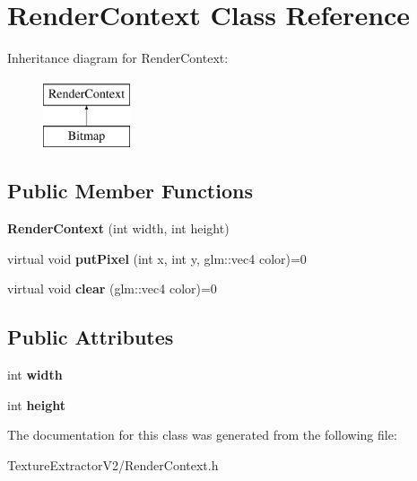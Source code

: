 \hypertarget{class_render_context}{}\section{Render\+Context Class Reference}
\label{class_render_context}
Inheritance diagram for Render\+Context\+:\begin{figure}[H]
\begin{center}
\leavevmode
\includegraphics[height=2.000000cm]{class_render_context}
\end{center}
\end{figure}
\subsection*{Public Member Functions}
\begin{DoxyCompactItemize}
\item 
\hypertarget{class_render_context_aff0b414b1aa39e7c5ca4ed5cadf20721}{}{\bfseries Render\+Context} (int width, int height)\label{class_render_context_aff0b414b1aa39e7c5ca4ed5cadf20721}

\item 
\hypertarget{class_render_context_a722f7e593dc2c480ad5a2a448196c2dc}{}virtual void {\bfseries put\+Pixel} (int x, int y, glm\+::vec4 color)=0\label{class_render_context_a722f7e593dc2c480ad5a2a448196c2dc}

\item 
\hypertarget{class_render_context_a9c6a34962ba769bacbb054ea435dfce8}{}virtual void {\bfseries clear} (glm\+::vec4 color)=0\label{class_render_context_a9c6a34962ba769bacbb054ea435dfce8}

\end{DoxyCompactItemize}
\subsection*{Public Attributes}
\begin{DoxyCompactItemize}
\item 
\hypertarget{class_render_context_a8009663c022d4a60d8a4dbfdb4183f46}{}int {\bfseries width}\label{class_render_context_a8009663c022d4a60d8a4dbfdb4183f46}

\item 
\hypertarget{class_render_context_a194a36ce3d85ae9ef5b40396e1e2d950}{}int {\bfseries height}\label{class_render_context_a194a36ce3d85ae9ef5b40396e1e2d950}

\end{DoxyCompactItemize}


The documentation for this class was generated from the following file\+:\begin{DoxyCompactItemize}
\item 
Texture\+Extractor\+V2/Render\+Context.\+h\end{DoxyCompactItemize}
